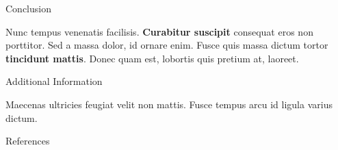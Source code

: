 \documentclass[final]{beamer}
\newlength{\onecolwid}
\begin{document}
\begin{frame}[t]
\begin{columns}[t]
    \begin{column}{\onecolwid} %


      \begin{block}{Conclusion}

        Nunc tempus venenatis facilisis. \textbf{Curabitur suscipit} consequat eros non
        porttitor. Sed a massa dolor, id ornare enim. Fusce quis massa dictum tortor
        \textbf{tincidunt mattis}. Donec quam est, lobortis quis pretium at, laoreet.

      \end{block}


      \begin{block}{Additional Information}

        Maecenas ultricies feugiat velit non mattis. Fusce tempus arcu id ligula varius
        dictum.

      \end{block}


      \begin{block}{References}

        \nocite{*} %
        \small{
          \vspace{0.75in}}

      \end{block}




\end{column}
\end{columns}
\end{frame}
\end{document}
